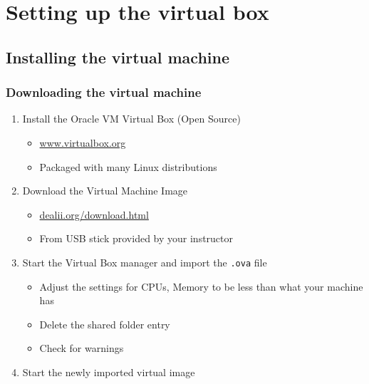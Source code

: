 \section[Virtual Box]{Setting up the virtual box}

\subsection{Installing the virtual machine}
\begin{frame}
  \frametitle{Downloading the virtual machine}
  \begin{enumerate}
  \item Install the Oracle VM Virtual Box (Open Source)
    \begin{itemize}
    \item \url{www.virtualbox.org}
    \item Packaged with many Linux distributions
    \end{itemize}
  \item Download the Virtual Machine Image
    \begin{itemize}
    \item  \url{dealii.org/download.html}
    \item From USB stick provided by your instructor
    \end{itemize}
    \item Start the Virtual Box manager and import the \texttt{.ova} file
      \begin{itemize}
      \item Adjust the settings for CPUs, Memory to be less than what
        your machine has
      \item Delete the shared folder entry
      \item Check for warnings
      \end{itemize}
    \item Start the newly imported virtual image
  \end{enumerate}
\end{frame}

